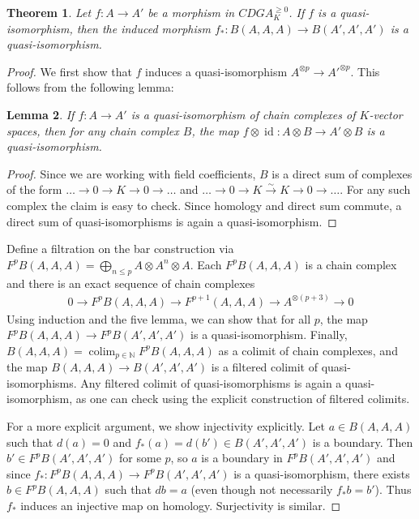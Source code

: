 \documentclass{scrartcl}
\theoremstyle{plain}
\newtheorem{theorem}{Theorem}[section]
\newtheorem{lemma}[theorem]{Lemma}
\theoremstyle{definition}
\newcommand{\N}{\mathbb N}
\let\xto\xrightarrow
\DeclareMathOperator{\id}{id}
\DeclareMathOperator{\colim}{colim}
\begin{document}
\begin{theorem}
    Let $f\colon A\to A'$ be a morphism in $CDGA_K^{\geq 0}$. If $f$ is a quasi-isomorphism, then the induced morphism $f_*\colon B(A, A, A)\to B(A', A', A')$ is a quasi-isomorphism.
\end{theorem}
\begin{proof}
    We first show that $f$ induces a quasi-isomorphism $A^{\otimes p} \to A'^{\otimes p}$. This follows from the following lemma: 
    \begin{lemma} If $f\colon A\to A'$ is a quasi-isomorphism of chain complexes of $K$-vector spaces, then for any chain complex $B$, the map $f\otimes \id\colon A\otimes B\to A'\otimes B$ is a quasi-isomorphism. 
    \end{lemma}
    \begin{proof}
        Since we are working with field coefficients, $B$ is a direct sum of complexes of the form $\dots\to0\to K\to 0\to\dots$ and $\dots\to 0\to K\xto{\sim} K\to 0\to\dots$. For any such complex the claim is easy to check. Since homology and direct sum commute, a direct sum of quasi-isomorphisms is again a quasi-isomorphism.
    \end{proof}
    Define a filtration on the bar construction via $F^pB(A, A, A) = \bigoplus_{n\leq p} A\otimes A^n\otimes A$. Each $F^pB(A, A, A)$ is a chain complex and there is an exact sequence of chain complexes
    \begin{align*}
        0\to F^pB(A, A, A)\to F^{p+1}(A, A, A) \to A^{\otimes(p+3)} \to 0
    \end{align*}
    Using induction and the five lemma, we can show that for all $p$, the map $F^pB(A, A, A)\to F^pB(A', A', A')$ is a quasi-isomorphism. Finally, $B(A, A, A)=\colim_{p\in \N} F^pB(A, A, A)$ as a colimit of chain complexes, and the map $B(A, A, A)\to B(A', A', A')$ is a filtered colimit of quasi-isomorphisms. Any filtered colimit of quasi-isomorphisms is again a quasi-isomorphism, as one can check using the explicit construction of filtered colimits. 
    
    For a more explicit argument, we show injectivity explicitly. Let $a\in B(A, A, A)$ such that $d(a) = 0$ and $f_*(a)=d(b')\in B(A', A', A')$ is a boundary. Then $b'\in F^pB(A', A', A')$ for some $p$, so $a$ is a boundary in $F^pB(A', A', A')$ and since $f_*\colon F^pB(A, A, A)\to F^pB(A', A', A')$ is a quasi-isomorphism, there exists $b\in F^pB(A, A, A)$ such that $db = a$ (even though not necessarily $f_*b = b'$). Thus $f_*$ induces an injective map on homology. Surjectivity is similar. 
\end{proof}
\end{document}
